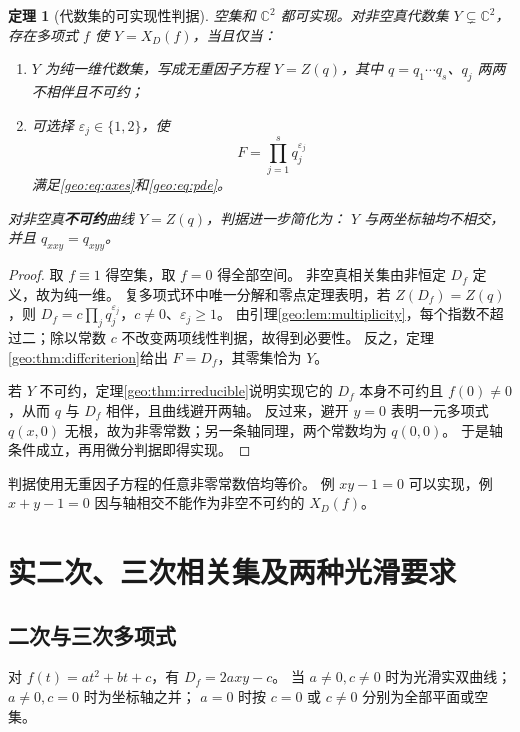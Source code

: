 \documentclass[11pt,a4paper,oneside,openany]{book}
\theoremstyle{lecture}
\newtheorem{theorem}{定理}[section]
\newcommand{\C}{\mathbb C}
\numberwithin{equation}{section}
\begin{document}
\begin{theorem}[代数集的可实现性判据]\label{geo:thm:realization}
空集和 $\C^2$ 都可实现。对非空真代数集 $Y\subsetneq\C^2$，存在多项式 $f$ 使 $Y=X_D(f)$，当且仅当：
\begin{enumerate}
\item $Y$ 为纯一维代数集，写成无重因子方程 $Y=Z(q)$，其中 $q=q_1\cdots q_s$、$q_j$ 两两不相伴且不可约；
\item 可选择 $\varepsilon_j\in\{1,2\}$，使
\[
 F=\prod_{j=1}^s q_j^{\varepsilon_j}
\]
满足\eqref{geo:eq:axes}和\eqref{geo:eq:pde}。
\end{enumerate}
对非空真\textbf{不可约}曲线 $Y=Z(q)$，判据进一步简化为：
$Y$ 与两坐标轴均不相交，并且 $q_{xxy}=q_{xyy}$。
\end{theorem}
\begin{proof}
取 $f\equiv1$ 得空集，取 $f=0$ 得全部空间。
非空真相关集由非恒定 $D_f$ 定义，故为纯一维。
复多项式环中唯一分解和零点定理表明，若 $Z(D_f)=Z(q)$，则
$D_f=c\prod_jq_j^{\varepsilon_j}$，$c\ne0$、$\varepsilon_j\ge1$。
由引理\ref{geo:lem:multiplicity}，每个指数不超过二；除以常数 $c$ 不改变两项线性判据，故得到必要性。
反之，定理\ref{geo:thm:diffcriterion}给出 $F=D_f$，其零集恰为 $Y$。

若 $Y$ 不可约，定理\ref{geo:thm:irreducible}说明实现它的 $D_f$ 本身不可约且 $f(0)\ne0$，从而 $q$ 与 $D_f$ 相伴，且曲线避开两轴。
反过来，避开 $y=0$ 表明一元多项式 $q(x,0)$ 无根，故为非零常数；另一条轴同理，两个常数均为 $q(0,0)$。
于是轴条件成立，再用微分判据即得实现。
\end{proof}
判据使用无重因子方程的任意非零常数倍均等价。
例 $xy-1=0$ 可以实现，例 $x+y-1=0$ 因与轴相交不能作为非空不可约的 $X_D(f)$。

\section{实二次、三次相关集及两种光滑要求}\label{geo:sec:real}
\subsection{二次与三次多项式}
对 $f(t)=at^2+bt+c$，有 $D_f=2axy-c$。
当 $a\ne0,c\ne0$ 时为光滑实双曲线；$a\ne0,c=0$ 时为坐标轴之并；
$a=0$ 时按 $c=0$ 或 $c\ne0$ 分别为全部平面或空集。
\end{document}
